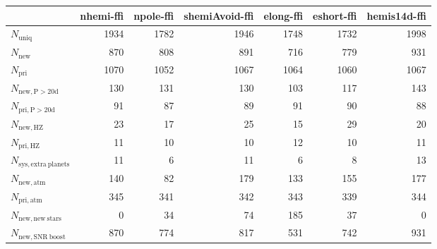 \begin{tabular}{lrrrrrr}
\toprule
{} &  nhemi-ffi &  npole-ffi &  shemiAvoid-ffi &  elong-ffi &  eshort-ffi &  hemis14d-ffi \\
\midrule
$N_{\mathrm{uniq}}$               &       1934 &       1782 &            1946 &       1748 &        1732 &          1998 \\
$N_{\mathrm{new}}$                &        870 &        808 &             891 &        716 &         779 &           931 \\
$N_{\mathrm{pri}}$                &       1070 &       1052 &            1067 &       1064 &        1060 &          1067 \\
$N_{\mathrm{new,P>20d}}$          &        130 &        131 &             130 &        103 &         117 &           143 \\
$N_{\mathrm{pri,P>20d}}$          &         91 &         87 &              89 &         91 &          90 &            88 \\
$N_{\mathrm{new,HZ}}$             &         23 &         17 &              25 &         15 &          29 &            20 \\
$N_{\mathrm{pri,HZ}}$             &         11 &         10 &              10 &         12 &          10 &            11 \\
$N_{\mathrm{sys,extra\ planets}}$ &         11 &          6 &              11 &          6 &           8 &            13 \\
$N_{\mathrm{new,atm}}$            &        140 &         82 &             179 &        133 &         155 &           177 \\
$N_{\mathrm{pri,atm}}$            &        345 &        341 &             342 &        343 &         339 &           344 \\
$N_{\mathrm{new,new\ stars}}$     &          0 &         34 &              74 &        185 &          37 &             0 \\
$N_{\mathrm{new,SNR\ boost}}$     &        870 &        774 &             817 &        531 &         742 &           931 \\
\bottomrule
\end{tabular}
